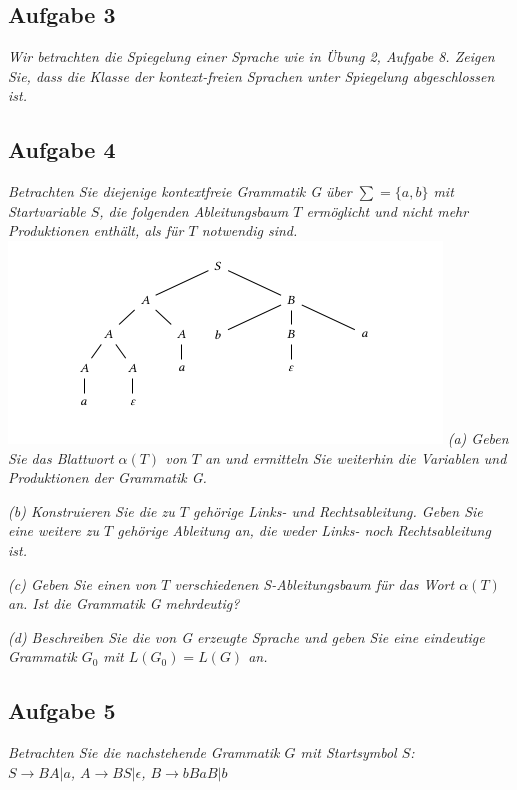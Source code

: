 \documentclass[a4paper]{article}
\begin{document}
\subsection{Aufgabe 3}
\textit{Wir betrachten die Spiegelung einer Sprache wie in Übung 2, Aufgabe 8. Zeigen Sie, dass die Klasse der kontext-freien Sprachen unter Spiegelung abgeschlossen ist.}



\subsection{Aufgabe 4}
\textit{Betrachten Sie diejenige kontextfreie Grammatik G über $\sum = \{a, b\}$ mit Startvariable $S$, die folgenden Ableitungsbaum $T$ ermöglicht und nicht mehr Produktionen enthält, als für $T$ notwendig sind.}
\includegraphics{Assets/ASK_uebung/u06_01.png}
\textit{(a) Geben Sie das Blattwort $\alpha(T)$ von $T$ an und ermitteln Sie weiterhin die Variablen und Produktionen der Grammatik G.}


\textit{(b) Konstruieren Sie die zu $T$ gehörige Links- und Rechtsableitung. Geben Sie eine weitere zu $T$ gehörige Ableitung an, die weder Links- noch Rechtsableitung ist.}


\textit{(c) Geben Sie einen von $T$ verschiedenen S-Ableitungsbaum für das Wort $\alpha(T)$ an. Ist die Grammatik G mehrdeutig?}


\textit{(d) Beschreiben Sie die von G erzeugte Sprache und geben Sie eine eindeutige Grammatik $G_0$ mit $L(G_0) = L(G)$ an.}

\subsection{Aufgabe 5}
\textit{Betrachten Sie die nachstehende Grammatik $G$ mit Startsymbol $S$:\\
    $S\rightarrow BA | a$, $A\rightarrow BS | \epsilon$, $B\rightarrow bBaB | b$}
\end{document}

